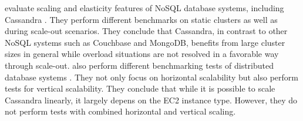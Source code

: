 \citeauthor{seyboldElasticityScalableDatabases2016} evaluate scaling and elasticity features of NoSQL database systems, including Cassandra \cite{seyboldElasticityScalableDatabases2016}. They perform different benchmarks on static clusters as well as during scale-out scenarios. They conclude that Cassandra, in contrast to other NoSQL systems such as Couchbase and MongoDB, benefits from large cluster sizes in general while overload situations are not resolved in a favorable way through scale-out. \citeauthor{kuhlenkampBenchmarkingScalabilityElasticity2014} also perform different benchmarking tests of distributed database systems \cite{kuhlenkampBenchmarkingScalabilityElasticity2014}. They not only focus on horizontal scalability but also perform tests for vertical scalability. They conclude that while it is possible to scale Cassandra linearly, it largely depens on the EC2 instance type. However, they do not perform tests with combined horizontal and vertical scaling.

